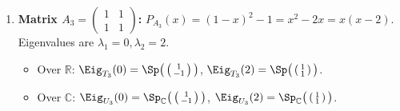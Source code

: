 \begin{exercisesolution*}
\begin{enumerate}[label=\textbf{(\alph*)}]
    \item \textbf{Matrix $A_3 = \left(\begin{smallmatrix} 1 & 1 \\ 1 & 1 \end{smallmatrix}\right)$:}
    $P_{A_3}(x) = (1-x)^2 - 1 = x^2 - 2x = x(x-2)$.
    Eigenvalues are $\lambda_1 = 0, \lambda_2 = 2$.
    \begin{itemize}
        \item Over $\mathbb{R}$: $\Eig_{T_3}(0) = \Sp\big(\left(\begin{smallmatrix} 1 \\ -1 \end{smallmatrix}\right)\big)$, $\Eig_{T_3}(2) = \Sp\big(\left(\begin{smallmatrix} 1 \\ 1 \end{smallmatrix}\right)\big)$.
        \item Over $\mathbb{C}$: $\Eig_{U_3}(0) = \Sp_\mathbb{C}\big(\left(\begin{smallmatrix} 1 \\ -1 \end{smallmatrix}\right)\big)$, $\Eig_{U_3}(2) = \Sp_\mathbb{C}\big(\left(\begin{smallmatrix} 1 \\ 1 \end{smallmatrix}\right)\big)$. \qedhere
    \end{itemize}
\end{enumerate}
\end{exercisesolution*}

